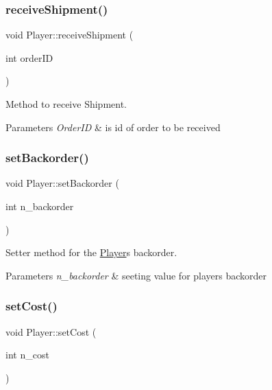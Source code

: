 \subsubsection{\texorpdfstring{receive\+Shipment()}{receiveShipment()}}
{\footnotesize\ttfamily void Player\+::receive\+Shipment (\begin{DoxyParamCaption}\item[{int}]{order\+ID }\end{DoxyParamCaption})}



Method to receive Shipment. 


\begin{DoxyParams}{Parameters}
{\em Order\+ID} & is id of order to be received \\
\hline
\end{DoxyParams}
\mbox{\label{class_player_a55cf59cc96744fee031167b7736e5d35}} 
\subsubsection{\texorpdfstring{set\+Backorder()}{setBackorder()}}
{\footnotesize\ttfamily void Player\+::set\+Backorder (\begin{DoxyParamCaption}\item[{int}]{n\+\_\+backorder }\end{DoxyParamCaption})}



Setter method for the \hyperlink{class_player}{Player}\textquotesingle{}s backorder. 


\begin{DoxyParams}{Parameters}
{\em n\+\_\+backorder} & seeting value for player\textquotesingle{}s backorder \\
\hline
\end{DoxyParams}
\mbox{\label{class_player_adae26798d67d12ad53bd3d9ba2e8b0fc}} 
\subsubsection{\texorpdfstring{set\+Cost()}{setCost()}}
{\footnotesize\ttfamily void Player\+::set\+Cost (\begin{DoxyParamCaption}\item[{int}]{n\+\_\+cost }\end{DoxyParamCaption})}



